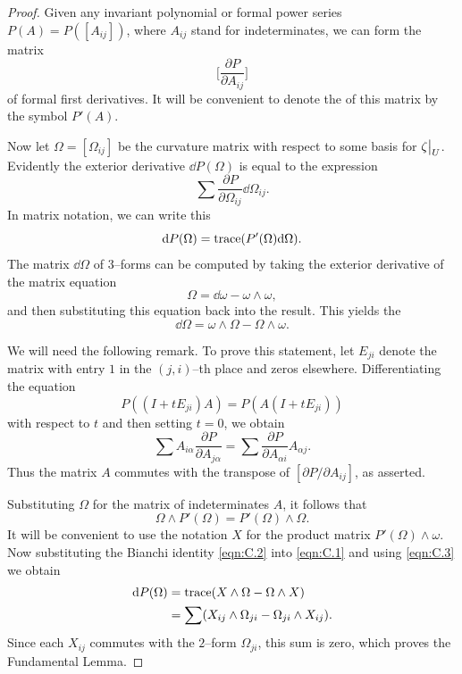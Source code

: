 \documentclass[../main]{subfiles}
\begin{document}
\begin{proof}
Given any invariant polynomial or formal power series $P(A) = P([A_{ij}])$, where $A_{ij}$ stand for indeterminates, we can form the matrix \[\bigg[\dfrac{\partial P}{\partial A_{ij}}\bigg]\] of formal first derivatives. It will be convenient to denote the  of this matrix by the symbol $P'(A)$. 

Now let $\Omega = [\Omega_{ij}]$ be the curvature matrix with respect to some basis for $\zeta \big{|}_U$. Evidently the exterior derivative $\dd P(\Omega)$ is equal to the expression \[\sum \dfrac{\partial P}{\partial \Omega_{ij}} \dd \Omega_{ij}.\] In matrix notation, we can write this
\begin{equation}
\label{eqn:C.1}
\mathrm{d} P(\Omega) = \operatorname{trace}(P'(\Omega) \mathrm{d} \Omega).
\end{equation}
The matrix $\dd \Omega$ of $3$--forms can be computed by taking the exterior derivative of the matrix equation \[\Omega = \dd  \omega - \omega \wedge \omega,\] and then substituting this equation back into the result. This yields the  
\begin{equation}
\label{eqn:C.2}
\dd \Omega = \omega \wedge \Omega - \Omega \wedge \omega.
\end{equation}

We will need the following remark.  To prove this statement, let $E_{ji}$ denote the matrix with entry $1$ in the $(j, i)$--th place and zeros elsewhere. Differentiating the equation \[P((I + t E_{ji})A) = P(A(I + t E_{ji}))\] with respect to $t$ and then setting $t = 0$, we obtain \[\sum A_{i \alpha} \dfrac{\partial P}{\partial A_{j \alpha}} = \sum \dfrac{\partial P}{\partial A_{\alpha i}} A_{\alpha j}.\] Thus the matrix $A$ commutes with the transpose of $[\partial P/\partial A_{ij}]$, as asserted. 

Substituting $\Omega$ for the matrix of indeterminates $A$, it follows that
\begin{equation}
\label{eqn:C.3}
\Omega \wedge P'(\Omega) = P'(\Omega) \wedge \Omega.
\end{equation}
It will be convenient to use the notation $X$ for the product matrix $P'(\Omega) \wedge \omega$. Now substituting the Bianchi identity \eqref{eqn:C.2} into \eqref{eqn:C.1} and using \eqref{eqn:C.3} we obtain 
\begin{align*}
\mathrm{d} P(\Omega) & = \operatorname{trace} (X \wedge \Omega - \Omega \wedge X) \\ & = \sum (X_{ij} \wedge \Omega_{ji} - \Omega_{ji} \wedge X_{ij}).
\end{align*}
Since each $X_{ij}$ commutes with the $2$--form $\Omega_{ji}$, this sum is zero, which proves the Fundamental Lemma. 
\end{proof}
\end{document}
